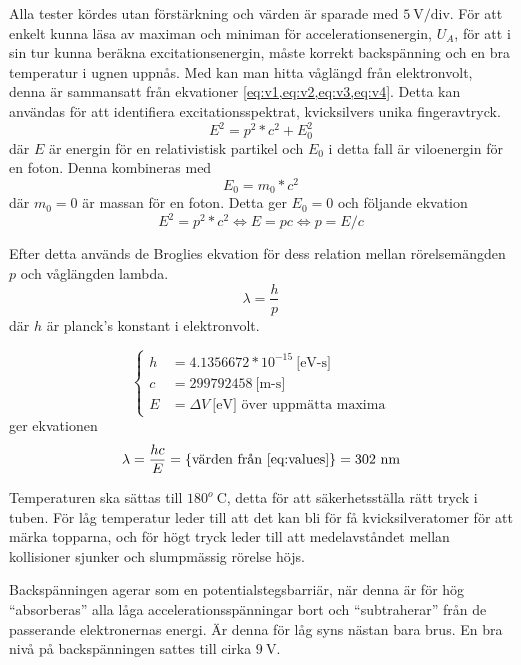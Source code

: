 Alla tester kördes utan förstärkning och värden är sparade med $5~\textrm{V/div.}$
För att enkelt kunna läsa av maximan och miniman för accelerationsenergin, $U_A$, för att i sin tur kunna beräkna excitationsenergin, måste korrekt backspänning och en bra temperatur i ugnen uppnås. Med  kan man hitta våglängd från elektronvolt, denna är sammansatt från ekvationer \cref{eq:v1,eq:v2,eq:v3,eq:v4}\cite[sec. 7.2]{ph}. Detta kan användas för att identifiera excitationsspektrat, kvicksilvers unika fingeravtryck.
\begin{equation}\label{eq:v1}E^2=p^2*c^2 + E_0^2\end{equation}
där $E$ är energin för en relativistisk partikel och $E_0$ i detta fall är viloenergin för en foton. Denna kombineras med
\begin{equation}\label{eq:v2}E_0=m_0*c^2\end{equation}
där $m_{0}=0$ är massan för en foton. Detta ger $E_0=0$ och följande ekvation
\begin{equation}\label{eq:v3}E^2=p^2*c^2 \Leftrightarrow E=pc \Leftrightarrow p=E/c \end{equation}

Efter detta används de Broglies ekvation för dess relation mellan rörelsemängden $p$ och våglängden lambda.
\begin{equation}\label{eq:v4}\lambda=\frac{h}{p}\end{equation}
där $h$ är planck's konstant i elektronvolt.

\begin{equation}\label{eq:values}
	\begin{cases}
		h	&= 4.1356672*10^{-15}~\textrm{[eV-s]}\\
		c	&= 299792458~\textrm{[m-s]}\\
		E	&= \Delta V~\textrm{[eV] över uppmätta maxima}
	\end{cases}
\end{equation}
ger ekvationen
\begin{equation}\label{eq:fin}
	\lambda = \frac{hc}{E} = \textrm{\{värden från \cref{eq:values}\}}=302~\textrm{nm}
\end{equation}

Temperaturen ska sättas till $180^o~\textrm{C}$, detta för att säkerhetsställa rätt tryck i tuben. För låg temperatur leder till att det kan bli för få kvicksilveratomer för att märka topparna, och för högt tryck leder till att medelavståndet mellan kollisioner sjunker och slumpmässig rörelse höjs\cite{rochhand}.

Backspänningen agerar som en potentialstegsbarriär, när denna är för hög ``absorberas'' alla låga accelerationsspänningar bort och ``subtraherar'' från de passerande elektronernas energi. Är denna för låg syns nästan bara brus.
En bra nivå på backspänningen sattes till cirka $9~\textrm{V}$.